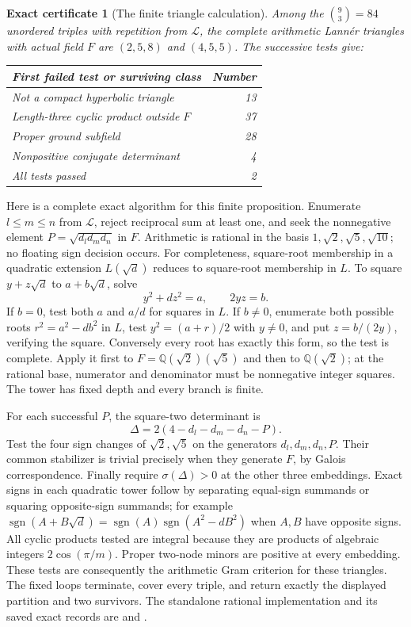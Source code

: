 \documentclass[11pt]{article}
\newtheorem{certificate}[theorem]{Exact certificate}
\newcommand{\Q}{\mathbb Q}
\begin{document}
\begin{certificate}[The finite triangle calculation]\label{cert:F25}
Among the $\binom{9}{3}=84$ unordered triples with repetition from $\mathcal L$,
the complete arithmetic Lann\'er triangles with actual field $F$ are
$(2,5,8)$ and $(4,5,5)$. The successive tests give:
\begin{center}\small
\begin{tabular}{lr}\toprule
First failed test or surviving class&Number\\\midrule
Not a compact hyperbolic triangle&13\\
Length-three cyclic product outside $F$&37\\
Proper ground subfield&28\\
Nonpositive conjugate determinant&4\\
All tests passed&2\\\bottomrule
\end{tabular}
\end{center}
\end{certificate}
Here is a complete exact algorithm for this finite proposition.
Enumerate $l\le m\le n$ from $\mathcal L$, reject reciprocal sum
at least one, and seek the nonnegative element
$P=\sqrt{d_ld_md_n}$ in $F$. Arithmetic is rational in the basis
$1,\sqrt2,\sqrt5,\sqrt{10}$; no floating sign decision occurs.
For completeness, square-root membership in a quadratic extension
$L(\sqrt d)$ reduces to square-root membership in $L$. To square
$y+z\sqrt d$ to $a+b\sqrt d$, solve
\[
 y^2+dz^2=a,\qquad 2yz=b.
\]
If $b=0$, test both $a$ and $a/d$ for squares in $L$.
If $b\ne0$, enumerate both possible roots
$r^2=a^2-db^2$ in $L$, test $y^2=(a+r)/2$ with $y\ne0$,
and put $z=b/(2y)$, verifying the square. Conversely every root
has exactly this form, so the test is complete. Apply it first to
$F=\Q(\sqrt2)(\sqrt5)$ and then to $\Q(\sqrt2)$; at the rational
base, numerator and denominator must be nonnegative integer squares.
The tower has fixed depth and every branch is finite.

For each successful $P$, the square-two determinant is
\[
 \Delta=2(4-d_l-d_m-d_n-P).
\]
Test the four sign changes of $\sqrt2,\sqrt5$ on the generators
$d_l,d_m,d_n,P$. Their common stabilizer is trivial precisely when
they generate $F$, by Galois correspondence. Finally require
$\sigma(\Delta)>0$ at the other three embeddings. Exact signs in
each quadratic tower follow by separating equal-sign summands or
squaring opposite-sign summands; for example
$\operatorname{sgn}(A+B\sqrt d)=\operatorname{sgn}(A)
\operatorname{sgn}(A^2-dB^2)$ when $A,B$ have opposite signs.
All cyclic products tested are integral because they are products of
algebraic integers $2\cos(\pi/m)$. Proper two-node minors are positive
at every embedding. These tests are consequently the arithmetic Gram
criterion for these triangles. The fixed loops terminate, cover every
triple, and return exactly the displayed partition and two survivors.
The standalone rational implementation and its saved exact records are
 and
.
\end{document}
